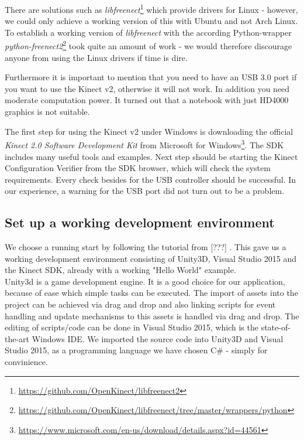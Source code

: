 \documentclass[11pt,a4paper,oldfontcommands, oneside]{memoir}
\begin{document}
There are solutions such as \emph{libfreenect}\footnote{\url{https://github.com/OpenKinect/libfreenect2}} which provide drivers for Linux - however, we could only achieve a working version of this with Ubuntu and not Arch Linux. To establish a working version of \emph{libfreenect} with the according Python-wrapper \emph{python-freenect2}\footnote{\url{https://github.com/OpenKinect/libfreenect/tree/master/wrappers/python}} took quite an amount of work - we would therefore discourage anyone from using the Linux drivers if time is dire.


Furthermore it is important to mention that you need to have an USB 3.0 port if you want to use the Kinect v2, otherwise it will not work. In addition you need moderate computation power. It turned out that a notebook with just HD4000 graphics is not suitable.


The first step for using the Kinect v2 under Windows is downloading the  official \emph{Kinect 2.0 Software Development Kit} from Microsoft for Windows\footnote{\url{https://www.microsoft.com/en-us/download/details.aspx?id=44561}}. The SDK includes many useful tools and examples. Next step should be starting the Kinect Configuration Verifier from the SDK browser, which will check the system requirements. Every check besides for the USB controller should be successful. In our experience, a warning for the USB port did not turn out to be a problem.\\

\subsection{Set up a working development environment}
We choose a running start by following the tutorial from [???] . This gave us a working development environment consisting of Unity3D, Visual Studio 2015 and the Kinect SDK, already with a working "Hello World" example.\\
Unity3d is a game development engine. It is a good choice for our application, because of ease which simple tasks can be executed. The import of assets into the project can be achieved via drag and drop and also linking scripts for event handling and update mechanisms to this assets is handled via drag and drop. The editing of scripts/code can be done in Visual Studio 2015, which is the state-of-the-art Windows IDE. We imported the source code into Unity3D and Visual Studio 2015, as a programming language we have chosen C\# - simply for convinience.
\end{document}
